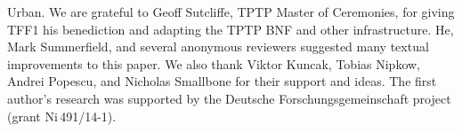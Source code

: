 \pagebreak

\noindent
Urban.
We are grateful to Geoff Sutcliffe, TPTP Master of Ceremonies, for giving TFF1
his benediction and adapting the TPTP BNF and other infrastructure.
He, Mark Summerfield, and several anonymous reviewers suggested many textual
improvements to this paper.
We also thank Viktor Kuncak, Tobias Nipkow, Andrei Popescu, and Nicholas Smallbone for their
support and ideas.
%
The first author's research was supported by the Deutsche
Forschungs\-gemein\-schaft project  (grant
Ni\,491\slash 14-1).
%
